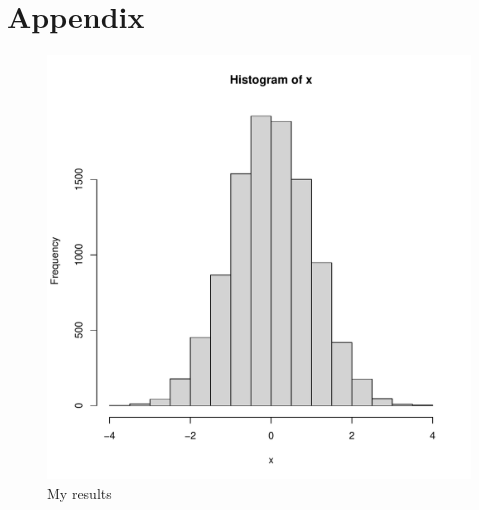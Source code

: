 \section{Appendix}

\begin{figure}[h]  
\centering 
\includegraphics[width=\textwidth]{inputs/figs/normal.pdf} 
\caption{ 
  My results
}
\end{figure}

